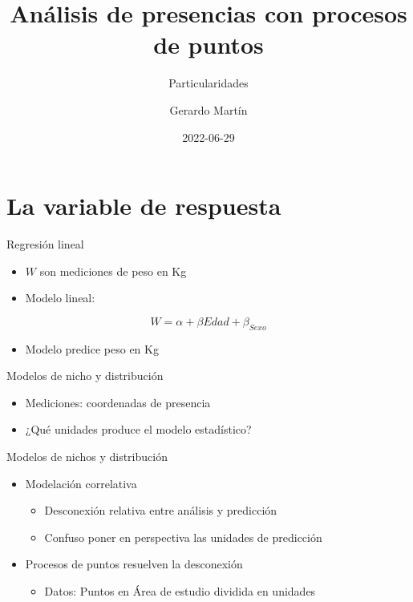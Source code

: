 \documentclass[
  11pt,
  ignorenonframetext,
]{beamer}
\title{Análisis de presencias con procesos de puntos}
\subtitle{Particularidades}
\author{Gerardo Martín}
\date{2022-06-29}
\providecommand{\tightlist}{%
  \setlength{\itemsep}{0pt}\setlength{\parskip}{0pt}}
\begin{document}
\frame{\titlepage}

\hypertarget{la-variable-de-respuesta}{%
\section{La variable de respuesta}\label{la-variable-de-respuesta}}

\begin{frame}{Regresión lineal}
\protect\hypertarget{regresiuxf3n-lineal}{}
\begin{itemize}
\item
  \(W\) son mediciones de peso en Kg
\item
  Modelo lineal:
\end{itemize}

\[W = \alpha + \beta Edad + \beta_{Sexo}\]

\begin{itemize}
\tightlist
\item
  Modelo predice peso en Kg
\end{itemize}
\end{frame}

\begin{frame}{Modelos de nicho y distribución}
\protect\hypertarget{modelos-de-nicho-y-distribuciuxf3n}{}
\begin{itemize}
\item
  Mediciones: coordenadas de presencia
\item
  ¿Qué unidades produce el modelo estadístico?
\end{itemize}
\end{frame}

\begin{frame}{Modelos de nichos y distribución}
\protect\hypertarget{modelos-de-nichos-y-distribuciuxf3n}{}
\begin{itemize}
\item
  Modelación correlativa

  \begin{itemize}
  \item
    Desconexión relativa entre análisis y predicción
  \item
    Confuso poner en perspectiva las unidades de predicción
  \end{itemize}
\item
  Procesos de puntos resuelven la desconexión

  \begin{itemize}
  \tightlist
  \item
    Datos: Puntos en Área de estudio dividida en unidades
  \end{itemize}
\end{itemize}
\end{frame}
\end{document}
